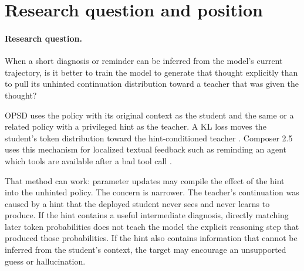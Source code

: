 \begin{abstract}
On-policy self-distillation (OPSD) can insert a corrective hint into a teacher context and
pull an unhinted student distribution toward the resulting continuation. The student,
however, never generates the hint that caused the teacher's behavior. This can be
undesirable when the hint expresses a diagnosis or realization that should be part of the
model's own reasoning. The proposed alternative is simple: put the hint into the training
trajectory as ordinary thinking tokens and use supervised fine-tuning (SFT) to teach the
model to generate them. During deployment there is no additional component. The model
thinks normally, generates the learned hint when the relevant situation occurs, and then
conditions its later tokens on that hint because it is already part of the autoregressive
prefix. This proposal compares that \emph{hinted SFT} construction with OPSD on localized
errors in long agent trajectories.
\end{abstract}

\section{Research question and position}

\paragraph{Research question.}
When a short diagnosis or reminder can be inferred from the model's current trajectory,
is it better to train the model to generate that thought explicitly than to pull its
unhinted continuation distribution toward a teacher that was given the thought?

OPSD uses the policy with its original context as the student and the same or a related
policy with a privileged hint as the teacher. A KL loss moves the student's token
distribution toward the hint-conditioned teacher
\citep{shenfeld2026selfdistillation,zhao2026selfdistilledreasoner,cursor2026composer25}.
Composer 2.5 uses this mechanism for localized textual feedback such as reminding an
agent which tools are available after a bad tool call \citep{cursor2026composer25}.

That method can work: parameter updates may compile the effect of the hint into the
unhinted policy. The concern is narrower. The teacher's continuation was caused by a hint
that the deployed student never sees and never learns to produce. If the hint contains a
useful intermediate diagnosis, directly matching later token probabilities does not teach
the model the explicit reasoning step that produced those probabilities. If the hint also
contains information that cannot be inferred from the student's context, the target may
encourage an unsupported guess or hallucination.

